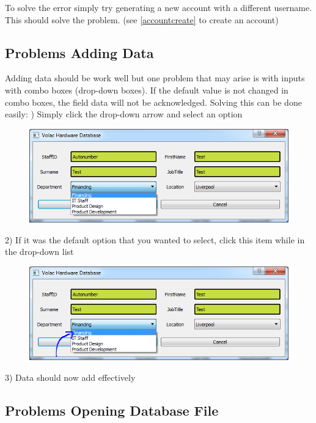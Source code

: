 To solve the error simply try generating a new account with a different username. This should solve the problem. (see \ref{accountcreate} to create an account)

\subsection{Problems Adding Data}

Adding data should be work well but one problem that may arise is with inputs with combo boxes (drop-down boxes). If the default value is not changed in combo boxes, the field data will not be acknowledged. Solving this can be done easily:
) Simply click the drop-down arrow and select an option

\begin{figure}[H]
    \includegraphics[width=\textwidth]{./Manual/Images/dropdownfix.png}
\end{figure}

2) If it was the default option that you wanted to select, click this item while in the drop-down list

\begin{figure}[H]
    \includegraphics[width=\textwidth]{./Manual/Images/dropdownfix2.png}
\end{figure}


3) Data should now add effectively

\subsection{Problems Opening Database File}

